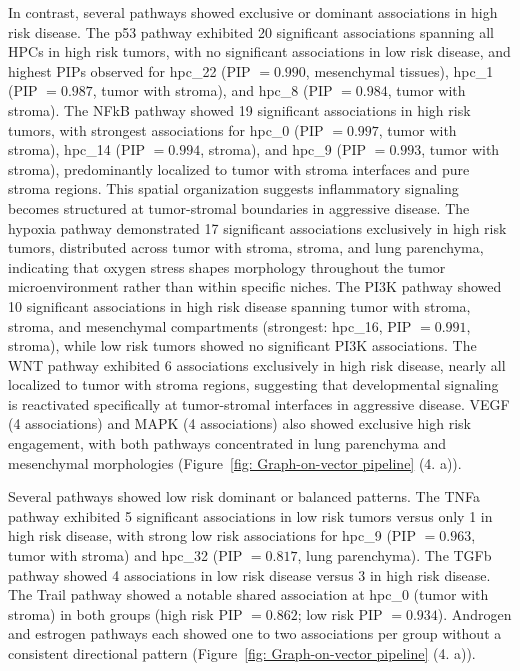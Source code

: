 \documentclass[pdflatex,article,12pt]{article}
\begin{document}
In contrast, several pathways showed exclusive or dominant associations in high risk disease. The p53 pathway exhibited 20 significant associations spanning all HPCs in high risk tumors, with no significant associations in low risk disease, and highest PIPs observed for hpc\_22 (PIP $= 0.990$, mesenchymal tissues), hpc\_1 (PIP $= 0.987$, tumor with stroma), and hpc\_8 (PIP $= 0.984$, tumor with stroma). The NFkB pathway showed 19 significant associations in high risk tumors, with strongest associations for hpc\_0 (PIP $= 0.997$, tumor with stroma), hpc\_14 (PIP $= 0.994$, stroma), and hpc\_9 (PIP $= 0.993$, tumor with stroma), predominantly localized to tumor with stroma interfaces and pure stroma regions. This spatial organization suggests inflammatory signaling becomes structured at tumor-stromal boundaries in aggressive disease. The hypoxia pathway demonstrated 17 significant associations exclusively in high risk tumors, distributed across tumor with stroma, stroma, and lung parenchyma, indicating that oxygen stress shapes morphology throughout the tumor microenvironment rather than within specific niches. The PI3K pathway showed 10 significant associations in high risk disease spanning tumor with stroma, stroma, and mesenchymal compartments (strongest: hpc\_16, PIP $= 0.991$, stroma), while low risk tumors showed no significant PI3K associations. The WNT pathway exhibited 6 associations exclusively in high risk disease, nearly all localized to tumor with stroma regions, suggesting that developmental signaling is reactivated specifically at tumor-stromal interfaces in aggressive disease. VEGF (4 associations) and MAPK (4 associations) also showed exclusive high risk engagement, with both pathways concentrated in lung parenchyma and mesenchymal morphologies (Figure~\ref{fig: Graph-on-vector pipeline} (4. a)).

Several pathways showed low risk dominant or balanced patterns. The TNFa pathway exhibited 5 significant associations in low risk tumors versus only 1 in high risk disease, with strong low risk associations for hpc\_9 (PIP $= 0.963$, tumor with stroma) and hpc\_32 (PIP $= 0.817$, lung parenchyma). The TGFb pathway showed 4 associations in low risk disease versus 3 in high risk disease. The Trail pathway showed a notable shared association at hpc\_0 (tumor with stroma) in both groups (high risk PIP $= 0.862$; low risk PIP $= 0.934$). Androgen and estrogen pathways each showed one to two associations per group without a consistent directional pattern (Figure~\ref{fig: Graph-on-vector pipeline} (4. a)).
\end{document}
